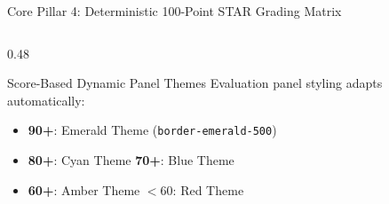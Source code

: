 \documentclass[aspectratio=169, 10pt]{beamer}
\begin{document}
\begin{frame}{Core Pillar 4: Deterministic 100-Point STAR Grading Matrix}
\begin{columns}
\begin{column}{0.48\textwidth}
      \begin{block}{Score-Based Dynamic Panel Themes}
        \small
        Evaluation panel styling adapts automatically:
        \begin{itemize}
          \item \textbf{90+}: Emerald Theme (\texttt{border-emerald-500})
          \item \textbf{80+}: Cyan Theme \quad \textbf{70+}: Blue Theme
          \item \textbf{60+}: Amber Theme \quad \textbf{$<60$}: Red Theme
        \end{itemize}
      \end{block}
    \end{column}
  \end{columns}
\end{frame}
\end{document}
